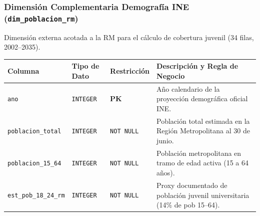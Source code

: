 \documentclass[11pt,a4paper]{article}
\begin{document}
\subsubsection{Dimensión Complementaria Demografía INE (\texttt{dim\_poblacion\_rm})}
Dimensión externa acotada a la RM para el cálculo de cobertura juvenil (34 filas, 2002--2035).
\begin{table}[h!]
\centering
\small
\begin{tabularx}{\textwidth}{lXlX}
\toprule
\textbf{Columna} & \textbf{Tipo de Dato} & \textbf{Restricción} & \textbf{Descripción y Regla de Negocio} \\
\midrule
\texttt{ano} & \texttt{INTEGER} & \textbf{PK} & Año calendario de la proyección demográfica oficial INE. \\
\texttt{poblacion\_total} & \texttt{INTEGER} & \texttt{NOT NULL} & Población total estimada en la Región Metropolitana al 30 de junio. \\
\texttt{poblacion\_15\_64} & \texttt{INTEGER} & \texttt{NOT NULL} & Población metropolitana en tramo de edad activa (15 a 64 años). \\
\texttt{est\_pob\_18\_24\_rm} & \texttt{INTEGER} & \texttt{NOT NULL} & Proxy documentado de población juvenil universitaria (14\% de pob 15--64). \\
\bottomrule
\end{tabularx}
\end{table}
\end{document}
